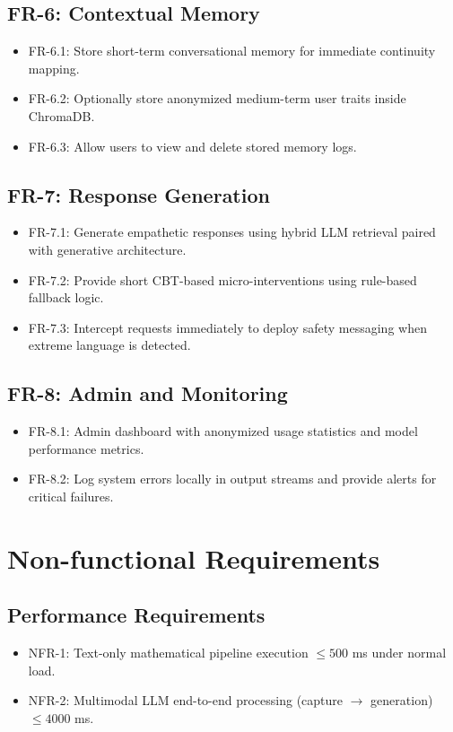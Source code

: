 \documentclass[11pt]{report}
\begin{document}
\subsection{FR-6: Contextual Memory}
\begin{itemize}
    \item FR-6.1: Store short-term conversational memory for immediate continuity mapping.
    \item FR-6.2: Optionally store anonymized medium-term user traits inside ChromaDB.
    \item FR-6.3: Allow users to view and delete stored memory logs.
\end{itemize}

\subsection{FR-7: Response Generation}
\begin{itemize}
    \item FR-7.1: Generate empathetic responses using hybrid LLM retrieval paired with generative architecture.
    \item FR-7.2: Provide short CBT-based micro-interventions using rule-based fallback logic.
    \item FR-7.3: Intercept requests immediately to deploy safety messaging when extreme language is detected.
\end{itemize}

\subsection{FR-8: Admin and Monitoring}
\begin{itemize}
    \item FR-8.1: Admin dashboard with anonymized usage statistics and model performance metrics.
    \item FR-8.2: Log system errors locally in output streams and provide alerts for critical failures.
\end{itemize}

\section{Non-functional Requirements}

\subsection{Performance Requirements}
\begin{itemize}
    \item NFR-1: Text-only mathematical pipeline execution $\le 500$ ms under normal load.
    \item NFR-2: Multimodal LLM end-to-end processing (capture $\to$ generation) $\le 4000$ ms.
\end{itemize}
\end{document}
